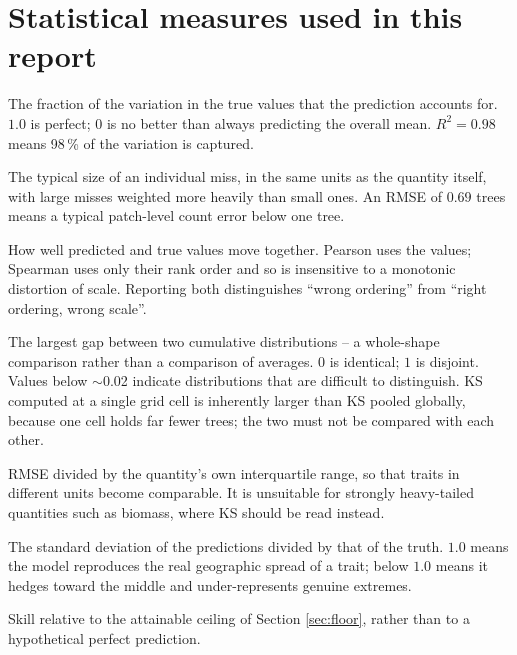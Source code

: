 \documentclass[11pt]{article}
\begin{document}
\section{Statistical measures used in this report}
\label{sec:measures}

\begin{description}[leftmargin=0em,style=nextline,itemsep=0.35em]
\item[$R^2$ (coefficient of determination)] The fraction of the variation in the true values that the prediction accounts for. $1.0$ is perfect; $0$ is no better than always predicting the overall mean. $R^2 = 0.98$ means 98\,\% of the variation is captured.
\item[RMSE (root-mean-square error)] The typical size of an individual miss, in the same units as the quantity itself, with large misses weighted more heavily than small ones. An RMSE of $0.69$ trees means a typical patch-level count error below one tree.
\item[Correlation ($r$, Pearson; $\rho$, Spearman)] How well predicted and true values move together. Pearson uses the values; Spearman uses only their rank order and so is insensitive to a monotonic distortion of scale. Reporting both distinguishes ``wrong ordering'' from ``right ordering, wrong scale''.
\item[Kolmogorov--Smirnov distance (KS)] The largest gap between two cumulative distributions -- a whole-shape comparison rather than a comparison of averages. $0$ is identical; $1$ is disjoint. Values below $\sim$0.02 indicate distributions that are difficult to distinguish. KS computed at a single grid cell is inherently larger than KS pooled globally, because one cell holds far fewer trees; the two must not be compared with each other.
\item[nqrmse] RMSE divided by the quantity's own interquartile range, so that traits in different units become comparable. It is unsuitable for strongly heavy-tailed quantities such as biomass, where KS should be read instead.
\item[Prediction-spread ratio] The standard deviation of the predictions divided by that of the truth. $1.0$ means the model reproduces the real geographic spread of a trait; below $1.0$ means it hedges toward the middle and under-represents genuine extremes.
\item[$r_\mathrm{center}$] Skill relative to the attainable ceiling of Section \ref{sec:floor}, rather than to a hypothetical perfect prediction.
\end{description}
\end{document}
